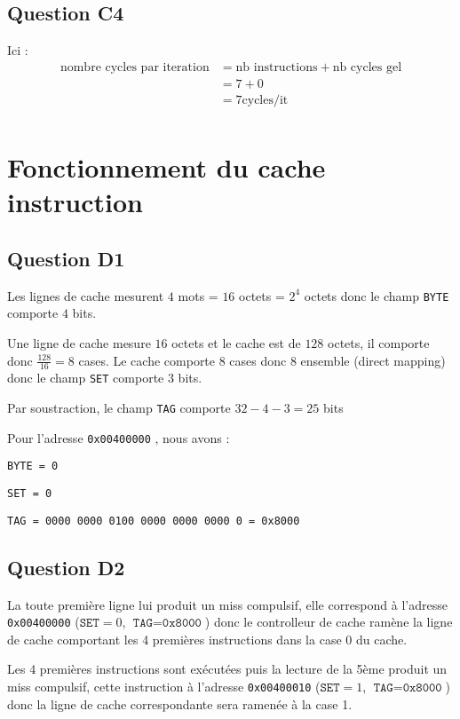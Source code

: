 \documentclass{article}
\begin{document}
\subsection{Question C4}

Ici :
\begin{align*}
\text{nombre cycles par iteration}  &= \text{nb instructions} + \text{nb cycles gel} \\
&= 7 + 0 \\
&= 7 \text{cycles/it} \\
\end{align*}


\section{Fonctionnement du cache instruction}

\subsection{Question D1}

Les lignes de cache mesurent $4$ mots = $16$ octets = $2^4$ octets
donc le champ \texttt{BYTE}  comporte $4$ bits.

Une ligne de cache mesure $16$ octets et le cache est de $128$ octets,
il comporte donc $ \frac{128}{16} = 8$ cases.
Le cache comporte $8$ cases donc $8$ ensemble (direct mapping)
donc le champ \texttt{SET}  comporte $3$ bits. 

Par soustraction, le champ \texttt{TAG}  comporte $32 - 4 - 3 = 25$ bits

Pour l'adresse \texttt{0x00400000} , nous avons :

\texttt{BYTE = 0} 

\texttt{SET = 0} 

\texttt{TAG = 0000 0000 0100 0000 0000 0000 0 = 0x8000}

\subsection{Question D2}

La toute première ligne lui produit un miss compulsif,
elle correspond à l'adresse \texttt{0x00400000}  ($\texttt{SET}  = 0$, $\texttt{TAG}  = \texttt{0x8000} $)
donc le controlleur de cache ramène la ligne de cache comportant
les 4 premières instructions dans la case 0 du cache.

Les 4 premières instructions sont exécutées puis la lecture de la 5ème
produit un miss compulsif, cette instruction à l'adresse \texttt{0x00400010}  
($\texttt{SET}  = 1$, $\texttt{TAG}  = \texttt{0x8000} $) donc la ligne de cache
correspondante sera ramenée à la case 1.
\end{document}
